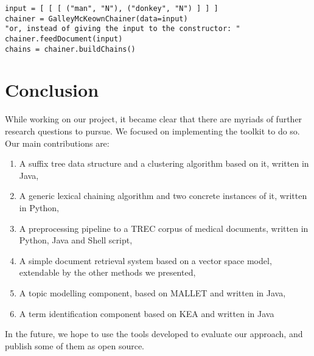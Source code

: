 \documentclass[11pt, a4paper, abstraction]{scrartcl}
\begin{document}
\lstset{language=Python}
\begin{lstlisting}
input = [ [ [ ("man", "N"), ("donkey", "N") ] ] ]
chainer = GalleyMcKeownChainer(data=input)
"or, instead of giving the input to the constructor: "
chainer.feedDocument(input)
chains = chainer.buildChains()
\end{lstlisting}



% 
% 
% 
% 
% 
% 

\section{Conclusion}
\label{sec:conclusion}

While working on our project, it became clear that there are myriads of further research questions to pursue. We focused on implementing the toolkit to do so. Our main contributions are:

\begin{enumerate}
  \item A suffix tree data structure and a clustering algorithm based on it, written in Java,
  \item A generic lexical chaining algorithm and two concrete instances of it, written in Python,
  \item A preprocessing pipeline to a TREC corpus of medical documents, written in Python, Java and Shell script,
  \item A simple document retrieval system based on a vector space model, extendable by the other methods we presented,
  \item A topic modelling component, based on MALLET and written in Java,
  \item A term identification component based on KEA and written in Java   
\end{enumerate} 

In the future, we hope to use the tools developed to evaluate our approach, and publish some of them as open source.
\end{document}
